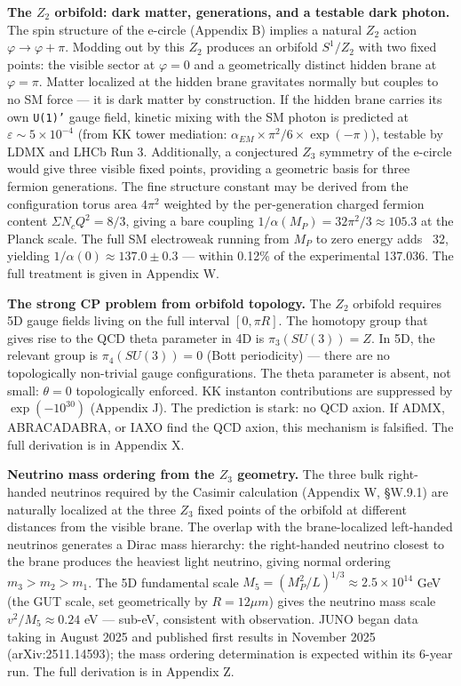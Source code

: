 \documentclass[aps,prd,preprint,superscriptaddress,longbibliography,floatfix]{revtex4-2}
\theoremstyle{remark}
\begin{document}
\textbf{The $Z_{2}$ orbifold: dark matter, generations, and a testable dark photon.} The spin structure of the e-circle (Appendix B) implies a natural $Z_{2}$ action $\varphi \to \varphi + \pi$. Modding out by this $Z_{2}$ produces an orbifold $S^{1}/Z_{2}$ with two fixed points: the visible sector at $\varphi = 0$ and a geometrically distinct hidden brane at $\varphi = \pi$. Matter localized at the hidden brane gravitates normally but couples to no SM force --- it is dark matter by construction. If the hidden brane carries its own \texttt{U(1)'} gauge field, kinetic mixing with the SM photon is predicted at $\varepsilon \sim  5 \times 10^{-4}$ (from KK tower mediation: $\alpha_{EM} \times \pi^{2}/6 \times \exp(-\pi)$), testable by LDMX and LHCb Run 3. Additionally, a conjectured $Z_{3}$ symmetry of the e-circle would give three visible fixed points, providing a geometric basis for three fermion generations. The fine structure constant may be derived from the configuration torus area $4\pi^{2}$ weighted by the per-generation charged fermion content $\Sigma N_c Q^{2} = 8/3$, giving a bare coupling $1/\alpha(M_P) = 32\pi^{2}/3 \approx 105.3$ at the Planck scale. The full SM electroweak running from $M_P$ to zero energy adds ~32, yielding $1/\alpha(0) \approx 137.0 \pm 0.3$ --- within 0.12\% of the experimental 137.036. The full treatment is given in Appendix W.

\textbf{The strong CP problem from orbifold topology.} The $Z_{2}$ orbifold requires 5D gauge fields living on the full interval $[0, \pi R]$. The homotopy group that gives rise to the QCD theta parameter in 4D is $\pi_{3}(SU(3)) = Z$. In 5D, the relevant group is $\pi_{4}(SU(3)) = 0$ (Bott periodicity) --- there are no topologically non-trivial gauge configurations. The theta parameter is absent, not small: $\theta = 0$ topologically enforced. KK instanton contributions are suppressed by $\exp(-10^{30})$ (Appendix J). The prediction is stark: no QCD axion. If ADMX, ABRACADABRA, or IAXO find the QCD axion, this mechanism is falsified. The full derivation is in Appendix X.

\textbf{Neutrino mass ordering from the $Z_{3}$ geometry.} The three bulk right-handed neutrinos required by the Casimir calculation (Appendix W, \S{}W.9.1) are naturally localized at the three $Z_{3}$ fixed points of the orbifold at different distances from the visible brane. The overlap with the brane-localized left-handed neutrinos generates a Dirac mass hierarchy: the right-handed neutrino closest to the brane produces the heaviest light neutrino, giving normal ordering $m_{3} > m_{2} > m_{1}$. The 5D fundamental scale $M_{5} = (M_P^{2}/L)^{1/3} \approx 2.5 \times 10^{14}$ GeV (the GUT scale, set geometrically by $R = 12 \mu m$) gives the neutrino mass scale $v^{2}/M_{5} \approx 0.24$ eV --- sub-eV, consistent with observation. JUNO began data taking in August 2025 and published first results in November 2025 (arXiv:2511.14593); the mass ordering determination is expected within its 6-year run. The full derivation is in Appendix Z.
\end{document}
